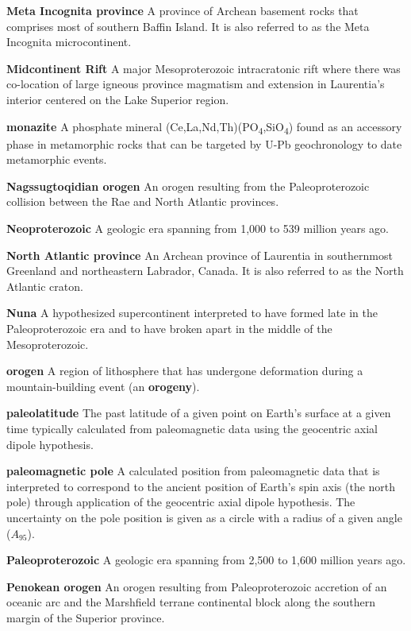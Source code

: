 \documentclass[twocolumn, switch]{article} %
\begin{document}
\noindent\textbf{Meta Incognita province } A province of Archean basement rocks that comprises most of southern Baffin Island. It is also referred to as the Meta Incognita microcontinent.

\noindent\textbf{Midcontinent Rift } A major Mesoproterozoic intracratonic rift where there was co-location of large igneous province magmatism and extension in Laurentia's interior centered on the Lake Superior region.

\noindent\textbf{monazite } A phosphate mineral (Ce,La,Nd,Th)(PO\textsubscript{4},SiO\textsubscript{4}) found as an accessory phase in metamorphic rocks that can be targeted by U-Pb geochronology to date metamorphic events.

\noindent\textbf{Nagssugtoqidian orogen } An orogen resulting from the Paleoproterozoic collision between the Rae and North Atlantic provinces.

\noindent\textbf{Neoproterozoic } A geologic era spanning from 1,000 to 539 million years ago.

\noindent\textbf{North Atlantic province } An Archean province of Laurentia in southernmost Greenland and northeastern Labrador, Canada. It is also referred to as the North Atlantic craton.

\noindent\textbf{Nuna } A hypothesized supercontinent interpreted to have formed late in the Paleoproterozoic era and to have broken apart in the middle of the Mesoproterozoic.

\noindent\textbf{orogen } A region of lithosphere that has undergone deformation during a mountain-building event (an \textbf{orogeny}).

\noindent\textbf{paleolatitude } The past latitude of a given point on Earth's surface at a given time typically calculated from paleomagnetic data using the geocentric axial dipole hypothesis.

\noindent\textbf{paleomagnetic pole } A calculated position from paleomagnetic data that is interpreted to correspond to the ancient position of Earth's spin axis (the north pole) through application of the geocentric axial dipole hypothesis. The uncertainty on the pole position is given as a circle with a radius of a given angle ($A_{95}$).

\noindent\textbf{Paleoproterozoic } A geologic era spanning from 2,500 to 1,600 million years ago.

\noindent\textbf{Penokean orogen } An orogen resulting from Paleoproterozoic accretion of an oceanic arc and the Marshfield terrane continental block along the southern margin of the Superior province.
\end{document}

